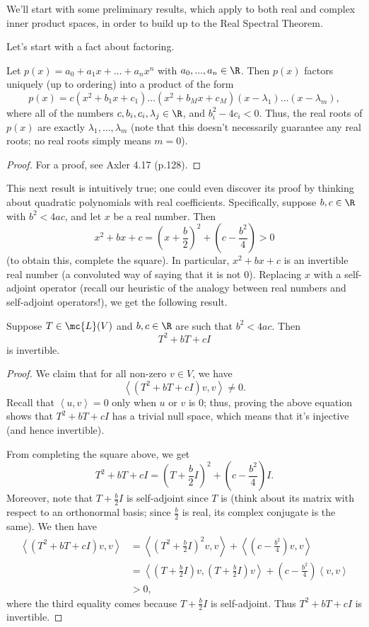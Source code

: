 \documentclass[math0540-lecture-notes.tex]{subfiles}
\begin{document}
We'll start with some preliminary results, which apply to both real and complex inner product
spaces, in order to build up to the Real Spectral Theorem.

Let's start with a fact about factoring.
\begin{proposition}{}
  Let $p(x)=a_0+a_1x+\ldots+a_nx^n$ with $a_0,...,a_n\in \R$. Then $p(x)$ factors uniquely (up to
  ordering) into a product of the form \[
    p(x)=c(x^2+b_1x+c_1)\ldots(x^2+b_Mx+c_M)(x-\lambda_1)\ldots(x-\lambda_m)
  ,\] where all of the numbers $c,b_i,c_i,\lambda_j\in \R$, and $b_i^2-4c_i<0$. Thus, the real roots
  of $p(x)$ are exactly $\lambda_1,\ldots,\lambda_m$ (note that this doesn't necessarily guarantee
  any real roots; no real roots simply means $m=0$).
\end{proposition}
\begin{proof}[Proof]
  For a proof, see Axler 4.17 (p.128).
\end{proof}
This next result is intuitively true; one could even discover its proof by thinking about quadratic
polynomials with real coefficients. Specifically, suppose $b,c\in \R$ with $b^2<4ac$, and let $x$ be
a real number. Then \[
  x^2+bx+c=\left( x+\frac{b}{2} \right) ^2+\left( c-\frac{b^2}{4} \right) >0
\] (to obtain this, complete the square). In particular, $x^2+bx+c$ is an invertible real number (a
convoluted way of saying that it is not $0$). Replacing $x$ with a self-adjoint operator (recall our
heuristic of the analogy between real numbers and self-adjoint operators!), we get the following
result.
\begin{proposition}{}
  Suppose $T\in \mc{L}(V)$ and $b,c\in \R$ are such that $b^2<4ac$. Then \[
    T^2+bT+cI
  \] is invertible.
\end{proposition}
\begin{proof}[Proof]
  We claim that for all non-zero $v\in V$, we have \[
    \left<(T^2+bT+cI)v,v \right> \neq 0
  .\] Recall that $\left<u,v \right> =0$ only when $u$ or $v$ is $0$; thus, proving the above
  equation shows that $T^2+bT+cI$ has a trivial null space, which means that it's injective (and
  hence invertible).

  From completing the square above, we get \[
    T^2+bT+cI=\left( T+\frac{b}{2}I \right) ^2+\left( c-\frac{b^2}{4} \right) I
  .\] Moreover, note that $T+\frac{b}{2}I$ is self-adjoint since $T$ is (think about its matrix with
  respect to an orthonormal basis; since $\frac{b}{2}$ is real, its complex conjugate is the same).
  We then have
  \begin{align*}
    \left<(T^2+bT+cI)v,v \right> &=\left<(T^2+\frac{b}{2}I)^2v,v \right> +\left<(c-\frac{b^2}{4})v,v
    \right>\\
                                 &=\left<(T+\frac{b}{2}I)v,(T+\frac{b}{2}I)v
                                 \right>+(c-\frac{b^2}{4})\left<v,v \right> \\
                                 &>0
  ,\end{align*}where the third equality comes because $T+\frac{b}{2}I$ is self-adjoint. Thus
  $T^2+bT+cI$ is invertible.
\end{proof}
\end{document}
